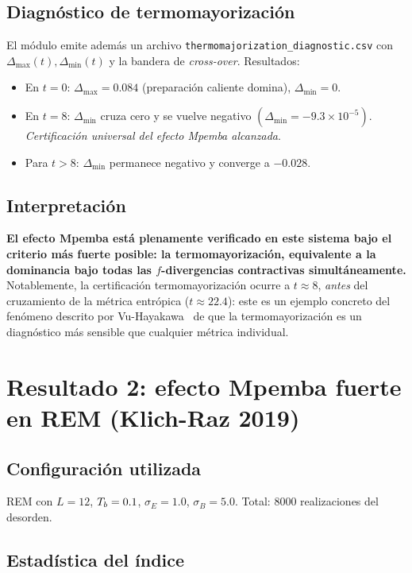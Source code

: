 \subsection{Diagnóstico de termomayorización}

El módulo emite además un archivo \texttt{thermomajorization\_diagnostic.csv} 
con $\Delta_{\max}(t), \Delta_{\min}(t)$ y la bandera de \emph{cross-over}. 
Resultados:
\begin{itemize}
\item En $t = 0$: $\Delta_{\max} = 0.084$ (preparación caliente domina), 
$\Delta_{\min} = 0$.
\item En $t = 8$: $\Delta_{\min}$ cruza cero y se vuelve negativo 
$(\Delta_{\min} = -9.3 \times 10^{-5})$. \emph{Certificación universal del 
efecto Mpemba alcanzada}.
\item Para $t > 8$: $\Delta_{\min}$ permanece negativo y converge a $-0.028$.
\end{itemize}

\subsection{Interpretación}

\textbf{El efecto Mpemba está plenamente verificado en este sistema bajo el 
criterio más fuerte posible: la termomayorización, equivalente a la dominancia 
bajo todas las $f$-divergencias contractivas simultáneamente.} Notablemente, la 
certificación termomayorización ocurre a $t \approx 8$, \emph{antes} del 
cruzamiento de la métrica entrópica ($t \approx 22.4$): este es un ejemplo 
concreto del fenómeno descrito por Vu-Hayakawa~\cite{vuhayakawa2025} de que la 
termomayorización es un diagnóstico más sensible que cualquier métrica 
individual.

\section{Resultado 2: efecto Mpemba fuerte en REM (Klich-Raz 2019)}

\subsection{Configuración utilizada}

REM con $L = 12$, $T_{b} = 0.1$, $\sigma_E = 1.0$, $\sigma_B = 5.0$. Total: 8000 
realizaciones del desorden.

\subsection{Estadística del índice}

